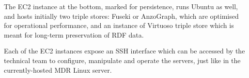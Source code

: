 	The EC2 instance at the bottom, marked for persistence, runs Ubuntu as well, and hosts initially two triple stores: Fuseki or AnzoGraph, which are optimised for operational performance, and an instance of Virtuoso triple store which is meant for long-term preservation of RDF data. 
	
	Each of the EC2 instances expose an SSH interface which can be accessed by the technical team to configure, manipulate and operate the servers, just like in the currently-hosted MDR Linux server. 
	